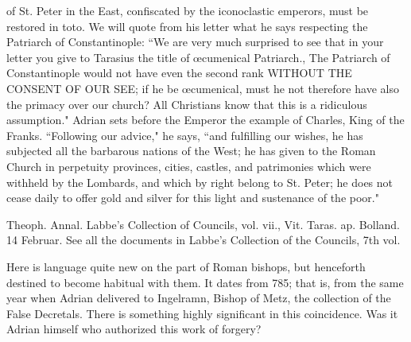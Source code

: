 of St. Peter in the East, confiscated by the iconoclastic emperors, must be restored in toto. We will quote from his letter what he says respecting the Patriarch of Constantinople: “We are very much surprised to see that in your letter you give to Tarasius the title of œcumenical Patriarch., The Patriarch of Constantinople would not have even the second rank WITHOUT THE CONSENT OF OUR SEE; if he be œcumenical, must he not therefore have also the primacy over our church? All Christians know that this is a ridiculous assumption." Adrian sets before the Emperor the example of Charles, King of the Franks. “Following our advice," he says, “and fulfilling our wishes, he has subjected all the barbarous nations of the West; he has given to the Roman Church in perpetuity provinces, cities, castles, and patrimonies which were withheld by the Lombards, and which by right belong to St. Peter; he does not cease daily to offer gold and silver for this light and sustenance of the poor."

Theoph. Annal. Labbe’s Collection of Councils, vol. vii., Vit. Taras. ap. Bolland. 14 Februar. See all the documents in Labbe’s Collection of the Councils, 7th vol.

Here is language quite new on the part of Roman bishops, but henceforth destined to become habitual with them. It dates from 785; that is, from the same year when Adrian delivered to Ingelramn, Bishop of Metz, the collection of the False Decretals. There is something highly significant in this coincidence. Was it Adrian himself who authorized this work of forgery?

